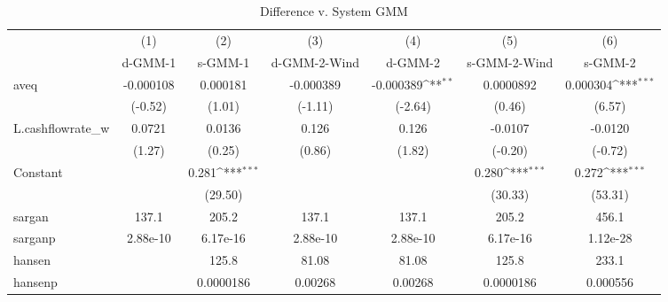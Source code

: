 \begin{table}[htbp]\centering
\def\sym#1{\ifmmode^{#1}\else\(^{#1}\)\fi}
\caption{Difference v. System GMM}
\begin{tabular}{l*{6}{c}}
\toprule
                    &\multicolumn{1}{c}{(1)}&\multicolumn{1}{c}{(2)}&\multicolumn{1}{c}{(3)}&\multicolumn{1}{c}{(4)}&\multicolumn{1}{c}{(5)}&\multicolumn{1}{c}{(6)}\\
                    &\multicolumn{1}{c}{d-GMM-1}&\multicolumn{1}{c}{s-GMM-1}&\multicolumn{1}{c}{d-GMM-2-Wind}&\multicolumn{1}{c}{d-GMM-2}&\multicolumn{1}{c}{s-GMM-2-Wind}&\multicolumn{1}{c}{s-GMM-2}\\
\midrule
aveq                &   -0.000108         &    0.000181         &   -0.000389         &   -0.000389\sym{**} &   0.0000892         &    0.000304\sym{***}\\
                    &     (-0.52)         &      (1.01)         &     (-1.11)         &     (-2.64)         &      (0.46)         &      (6.57)         \\
\addlinespace
L.cashflowrate\_w    &      0.0721         &      0.0136         &       0.126         &       0.126         &     -0.0107         &     -0.0120         \\
                    &      (1.27)         &      (0.25)         &      (0.86)         &      (1.82)         &     (-0.20)         &     (-0.72)         \\
\addlinespace
Constant            &                     &       0.281\sym{***}&                     &                     &       0.280\sym{***}&       0.272\sym{***}\\
                    &                     &     (29.50)         &                     &                     &     (30.33)         &     (53.31)         \\
\midrule
sargan              &       137.1         &       205.2         &       137.1         &       137.1         &       205.2         &       456.1         \\
sarganp             &    2.88e-10         &    6.17e-16         &    2.88e-10         &    2.88e-10         &    6.17e-16         &    1.12e-28         \\
hansen              &                     &       125.8         &       81.08         &       81.08         &       125.8         &       233.1         \\
hansenp             &                     &   0.0000186         &     0.00268         &     0.00268         &   0.0000186         &    0.000556         \\

\end{tabular}
\end{table}
